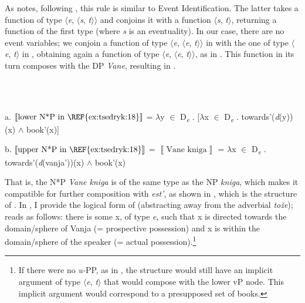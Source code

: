 \documentclass[output=paper,colorlinks,citecolor=brown]{./langscibook}
\begin{document}
As \citet{Myler2016} notes, following \citet{Wood2015}, this rule is similar to  Event Identification. The latter takes a function of type ${\langle}$\textit{e}, ${\langle}$\textit{s}, \textit{t}${\rangle}{\rangle}$ and conjoins it with a function ${\langle}$\textit{s}, \textit{t}${\rangle}$, returning a function of the first type (where \textit{s} is an eventuality). In our case, there are no event variables; we conjoin a function of type ${\langle}$\textit{e}, ${\langle}$\textit{e}, \textit{t}${\rangle}{\rangle}$ in  with the one of type ${\langle}$\textit{e}, \textit{t}${\rangle}$ in , obtaining again a function of type ${\langle}$\textit{e}, ${\langle}$\textit{e}, \textit{t}${\rangle}{\rangle}$, as in . This function in its turn composes with the DP \textit{Vane}, resulting in .

\ea%
    \label{ex:tsedryk:25}
    \gll\\
        \\
    \glt
    \z

          a.   $\left\llbracket \text{lower N*P in \REF{ex:tsedryk:18}}\right\rrbracket $ = ${\lambda}$y ${\in}$ D\textit{\textsubscript{e}} . [${\lambda}$x ${\in}$ D\textit{\textsubscript{e}} . towards'(\textit{d}(y))(x) ${\wedge}$ book'(x)]     

  b.     $\left\llbracket \text{upper N*P in \REF{ex:tsedryk:18}}\right\rrbracket $   =  $\left\llbracket \text{Vane kniga}\right\rrbracket $ = ${\lambda}$x ${\in}$ D\textit{\textsubscript{e}} . towards'(\textit{d}(vanja'))(x) ${\wedge}$ book'(x)

That is, the N*P \textit{Vane kniga} is of the same type as the NP \textit{kniga}, which makes it compatible for further composition with \textit{est’}, as shown in , which is the structure of . In , I provide the logical form of  (abstracting away from the adverbial \textit{tože});  reads as follows: there is some x, of type \textit{e}, such that x is directed towards the domain/sphere of Vanja (= prospective possession) and x is within the domain/sphere of the speaker (= actual possession).\footnote{If there were no \textit{u-}PP, as in , the structure would still have an implicit argument of type \textrm{${\langle}$}\textit{e}, \textit{t}\textrm{${\rangle}$} that would compose with the lower vP node. This implicit argument would correspond to a presupposed set of books. }   
\end{document}
